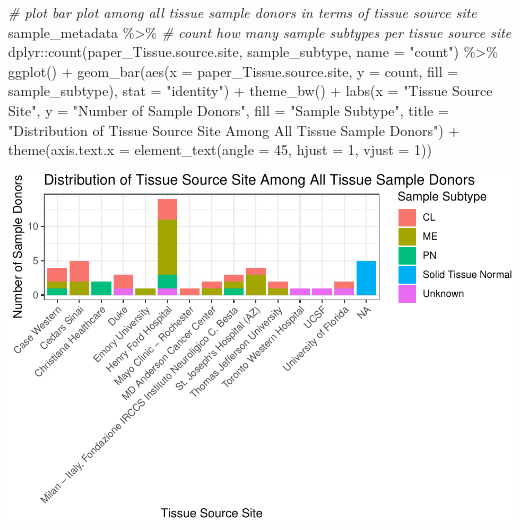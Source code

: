 \documentclass[
]{article}
\newenvironment{Shaded}{\begin{snugshade}}{\end{snugshade}}
\newcommand{\AttributeTok}[1]{\textcolor[rgb]{0.77,0.63,0.00}{#1}}
\newcommand{\CommentTok}[1]{\textcolor[rgb]{0.56,0.35,0.01}{\textit{#1}}}
\newcommand{\DecValTok}[1]{\textcolor[rgb]{0.00,0.00,0.81}{#1}}
\newcommand{\FunctionTok}[1]{\textcolor[rgb]{0.00,0.00,0.00}{#1}}
\newcommand{\NormalTok}[1]{#1}
\newcommand{\SpecialCharTok}[1]{\textcolor[rgb]{0.00,0.00,0.00}{#1}}
\newcommand{\StringTok}[1]{\textcolor[rgb]{0.31,0.60,0.02}{#1}}
\begin{document}
\begin{Shaded}
\begin{Highlighting}[]
\CommentTok{\# plot bar plot among all tissue sample donors in terms of tissue source site}
\NormalTok{sample\_metadata }\SpecialCharTok{\%\textgreater{}\%} 
  \CommentTok{\# count how many sample subtypes per tissue source site}
\NormalTok{  dplyr}\SpecialCharTok{::}\FunctionTok{count}\NormalTok{(paper\_Tissue.source.site, sample\_subtype, }\AttributeTok{name =} \StringTok{"count"}\NormalTok{) }\SpecialCharTok{\%\textgreater{}\%} 
  \FunctionTok{ggplot}\NormalTok{() }\SpecialCharTok{+}
  \FunctionTok{geom\_bar}\NormalTok{(}\FunctionTok{aes}\NormalTok{(}\AttributeTok{x =}\NormalTok{ paper\_Tissue.source.site, }\AttributeTok{y =}\NormalTok{ count, }\AttributeTok{fill =}\NormalTok{ sample\_subtype), }\AttributeTok{stat =} \StringTok{"identity"}\NormalTok{) }\SpecialCharTok{+}
  \FunctionTok{theme\_bw}\NormalTok{() }\SpecialCharTok{+}
  \FunctionTok{labs}\NormalTok{(}\AttributeTok{x =} \StringTok{"Tissue Source Site"}\NormalTok{, }\AttributeTok{y =} \StringTok{"Number of Sample Donors"}\NormalTok{, }\AttributeTok{fill =} \StringTok{"Sample Subtype"}\NormalTok{,}
       \AttributeTok{title =} \StringTok{"Distribution of Tissue Source Site Among All Tissue Sample Donors"}\NormalTok{) }\SpecialCharTok{+}
  \FunctionTok{theme}\NormalTok{(}\AttributeTok{axis.text.x =} \FunctionTok{element\_text}\NormalTok{(}\AttributeTok{angle =} \DecValTok{45}\NormalTok{, }\AttributeTok{hjust =} \DecValTok{1}\NormalTok{, }\AttributeTok{vjust =} \DecValTok{1}\NormalTok{))}
\end{Highlighting}
\end{Shaded}

\includegraphics{LiuKevin_Final_Project_files/figure-latex/unnamed-chunk-8-1.pdf}
\end{document}
